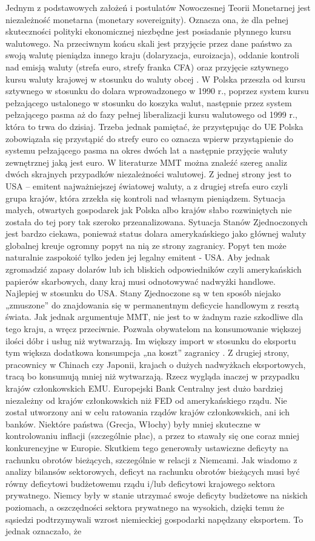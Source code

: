 \documentclass[
]{book}
\begin{document}
Jednym z podstawowych założeń i postulatów Nowoczesnej Teorii Monetarnej jest niezależność monetarna (monetary sovereignity). Oznacza ona, że dla pełnej skuteczności polityki ekonomicznej niezbędne jest posiadanie płynnego kursu walutowego. Na przeciwnym końcu skali jest przyjęcie przez dane państwo za swoją walutę pieniądza innego kraju (dolaryzacja, euroizacja), oddanie kontroli nad emisją waluty (strefa euro, strefy franka CFA) oraz przyjęcie sztywnego kursu waluty krajowej w stosunku do waluty obcej . W Polska przeszła od kursu sztywnego w stosunku do dolara wprowadzonego w 1990 r., poprzez system kursu pełzającego ustalonego w stosunku do koszyka walut, następnie przez system pełzającego pasma aż do fazy pełnej liberalizacji kursu walutowego od 1999 r., która to trwa do dzisiaj. Trzeba jednak pamiętać, że przystępując do UE Polska zobowiązała się przystąpić do strefy euro co oznacza wpierw przystąpienie do systemu pełzającego pasma na okres dwóch lat a następnie przyjęcie waluty zewnętrznej jaką jest euro. W literaturze MMT można znaleźć szereg analiz dwóch skrajnych przypadków niezależności walutowej. Z jednej strony jest to USA -- emitent najważniejszej światowej waluty, a z drugiej strefa euro czyli grupa krajów, która zrzekła się kontroli nad własnym pieniądzem. Sytuacja małych, otwartych gospodarek jak Polska albo krajów słabo rozwiniętych nie została do tej pory tak szeroko przeanalizowana. Sytuacja Stanów Zjednoczonych jest bardzo ciekawa, ponieważ status dolara amerykańskiego jako głównej waluty globalnej kreuje ogromny popyt na nią ze strony zagranicy. Popyt ten może naturalnie zaspokoić tylko jeden jej legalny emitent - USA. Aby jednak zgromadzić zapasy dolarów lub ich bliskich odpowiedników czyli amerykańskich papierów skarbowych, dany kraj musi odnotowywać nadwyżki handlowe. Najlepiej w stosunku do USA. Stany Zjednoczone są w ten sposób niejako „zmuszone'' do znajdowania się w permanentnym deficycie handlowym z resztą świata. Jak jednak argumentuje MMT, nie jest to w żadnym razie szkodliwe dla tego kraju, a wręcz przeciwnie. Pozwala obywatelom na konsumowanie większej ilości dóbr i usług niż wytwarzają. Im większy import w stosunku do eksportu tym większa dodatkowa konsumpcja „na koszt'' zagranicy . Z drugiej strony, pracownicy w Chinach czy Japonii, krajach o dużych nadwyżkach eksportowych, tracą bo konsumują mniej niż wytwarzają. Rzecz wygląda inaczej w przypadku krajów członkowskich EMU. Europejski Bank Centralny jest dużo bardziej niezależny od krajów członkowskich niż FED od amerykańskiego rządu. Nie został utworzony ani w celu ratowania rządów krajów członkowskich, ani ich banków. Niektóre państwa (Grecja, Włochy) były mniej skuteczne w kontrolowaniu inflacji (szczególnie płac), a przez to stawały się one coraz mniej konkurencyjne w Europie. Skutkiem tego generowały ustawiczne deficyty na rachunku obrotów bieżących, szczególnie w relacji z Niemcami. Jak wiadomo z analizy bilansów sektorowych, deficyt na rachunku obrotów bieżących musi być równy deficytowi budżetowemu rządu i/lub deficytowi krajowego sektora prywatnego. Niemcy były w stanie utrzymać swoje deficyty budżetowe na niskich poziomach, a oszczędności sektora prywatnego na wysokich, dzięki temu że sąsiedzi podtrzymywali wzrost niemieckiej gospodarki napędzany eksportem. To jednak oznaczało, że 
\end{document}
